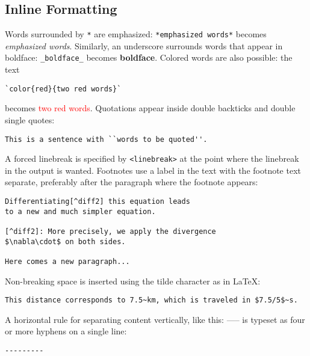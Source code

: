\documentclass[%
oneside,                 %
final,                   %
10pt]{article}
\begin{document}
\subsection{Inline Formatting}
Words surrounded by \texttt{*} are emphasized: \texttt{*emphasized words*} becomes
\emph{emphasized words}. Similarly, an underscore surrounds words that
appear in boldface: \Verb!_boldface_! becomes \textbf{boldface}. Colored words
are also possible: the text
\begin{Verbatim}[numbers=none,fontsize=\fontsize{9pt}{9pt},baselinestretch=0.95,xleftmargin=2mm]
`color{red}{two red words}`

\end{Verbatim}

becomes \textcolor{red}{two red words}.
Quotations appear inside double backticks and double single quotes:
\begin{Verbatim}[numbers=none,fontsize=\fontsize{9pt}{9pt},baselinestretch=0.95,xleftmargin=2mm]
This is a sentence with ``words to be quoted''.

\end{Verbatim}

A forced linebreak is specified by \texttt{<linebreak>} at the point where the
linebreak in the output is wanted.
Footnotes use a label in the text with the footnote text separate,
preferably after the paragraph where the footnote appears:
\begin{Verbatim}[numbers=none,fontsize=\fontsize{9pt}{9pt},baselinestretch=0.95,xleftmargin=2mm]
Differentiating[^diff2] this equation leads
to a new and much simpler equation.

[^diff2]: More precisely, we apply the divergence
$\nabla\cdot$ on both sides.

Here comes a new paragraph...

\end{Verbatim}

Non-breaking space is inserted using the tilde character as in {\LaTeX}:
\begin{Verbatim}[numbers=none,fontsize=\fontsize{9pt}{9pt},baselinestretch=0.95,xleftmargin=2mm]
This distance corresponds to 7.5~km, which is traveled in $7.5/5$~s.

\end{Verbatim}

A horizontal rule for separating content vertically, like this:
-----
is typeset as four or more hyphens on a single line:
\begin{Verbatim}[numbers=none,fontsize=\fontsize{9pt}{9pt},baselinestretch=0.95,xleftmargin=2mm]
---------

\end{Verbatim}
\end{document}
